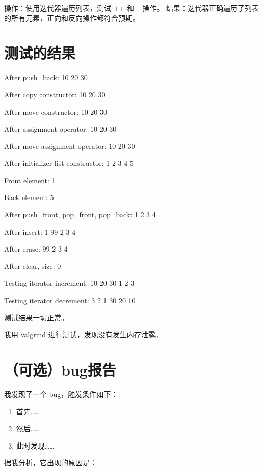 \documentclass[UTF8]{ctexart}
\begin{document}
操作：使用迭代器遍历列表，测试 ++ 和 -- 操作。
结果：迭代器正确遍历了列表的所有元素，正向和反向操作都符合预期。

\section{测试的结果}

After push_back: 10 20 30 

After copy constructor: 10 20 30

After move constructor: 10 20 30

After assignment operator: 10 20 30

After move assignment operator: 10 20 30

After initializer list constructor: 1 2 3 4 5

Front element: 1

Back element: 5

After push_front, pop_front, pop_back: 1 2 3 4

After insert: 1 99 2 3 4

After erase: 99 2 3 4

After clear, size: 0

Testing iterator increment: 10 20 30 1 2 3

Testing iterator decrement: 3 2 1 30 20 10

测试结果一切正常。

我用 valgrind 进行测试，发现没有发生内存泄露。

\section{（可选）bug报告}

我发现了一个 bug，触发条件如下：

\begin{enumerate}
    \item 首先……
    \item 然后……
    \item 此时发现……
\end{enumerate}

据我分析，它出现的原因是：
\end{document}
